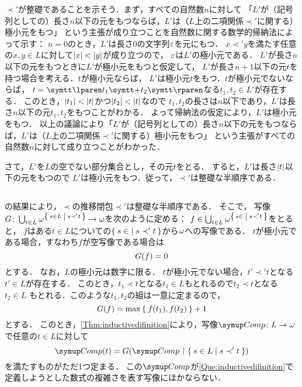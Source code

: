 \(\prec'\)が整礎であることを示そう．まず，すべての自然数\(n\)に対して
「\(L'\)が（記号列としての）長さ\(n\)以下の元をもつならば，\(L'\)は（\(L\)上の二項関係\(\prec'\)に関する）極小元をもつ」
という主張が成り立つことを自然数に関する数学的帰納法によって示す：
\(n=0\)のとき，\(L'\)は長さ0の文字列\(\varepsilon\)を元にもつ．
\(x \prec' y\)を満たす任意の\(x, y \in L\)に対して\(\length{x} < \length{y}\)が成り立つので，
\(\varepsilon\)は\(L'\)の極小元である．
\(L'\)が長さ\(n\)以下の元をもつときに\(L'\)が極小元をもつと仮定して，
\(L'\)が長さ\(n + 1\)以下の元\(t\)を持つ場合を考える．\(t\)が極小元ならば，
\(L'\)は極小元\(t\)をもつ．\(t\)が極小元でないならば，
\(t = \obj{\lparen} t_1 \obj{+} t_2 \obj{\rparen}\)なる\(t_1, t_2 \in L'\)が存在する．
このとき，\(\length{t_1} < \length{t}\)かつ\(\length{t_2} < \length{t}\)なので
\(t_1, t_2\)の長さは\(n\)以下であり，\(L'\)は長さ\(n\)以下の元\(t_1, t_2\)をもつことがわかる．
よって帰納法の仮定により，\(L'\)は極小元をもつ．
以上の議論により「\(L'\)が（記号列としての）長さ\(n\)以下の元をもつならば，\(L'\)は（\(L\)上の二項関係\(\prec'\)に関する）極小元をもつ」
という主張がすべての自然数\(n\)に対して成り立つことがわかった．

さて，\(L'\)を\(L\)の空でない部分集合とし，その元\(t\)をとる．
すると，\(L'\)は長さ\(\length{t}\)以下の元をもつので
\(L'\)は極小元をもつ．従って，\(\prec'\)は整礎な半順序である．

\subsection*{}

の結果により，\(\prec\)の推移閉包\(\prec'\)は整礎な半順序である．
そこで，
写像\(G \colon \bigcup_{t \in L} \omega^{\Set{s \in L | s \prec' t }} \to \omega\)を次のように定める：
\(f \in \bigcup_{t \in L} \omega^{\Set{s \in | s \prec' t}}\)をとると，
\(f\)はある\(t \in L\)についての\(\Set{s \in | s \prec' t}\)から\(\omega\)への写像である．
\(t\)が極小元である場合，すなわち\(f\)が空写像である場合は
\[
	\apply{G}{f} = 0
\]
とする．
なお，\(L\)の極小元は数字に限る．
\(t\)が極小元でない場合，\(t' \prec' t\)となる\(t' \in L\)が存在する．
このとき，\(t_1 \prec t\)となる\(t_1 \in L\)もとれるので\(t_2 \prec t\)となる\(t_2 \in L\)
もとれる．このような\(t_1, t_2\)の組は一意に定まるので，
\[
	\apply{G}{f} = \max \Set{\apply{f}{t_1}, \apply{f}{t_2}} + 1
\]
とする．
\begingroup
{}
このとき，\cref{Thm:inductivedifinition}により，写像\({\Comp} \colon L \to \Natural\)
で任意の\(t \in L\)に対して
\[
	\apply{\Comp}{t} = \apply{G}{ \Comp \restriction \Set{s \in L | s \prec' t}}
\]
を満たすものがただ1つ定まる．
この\(\Comp\)が\cref{Que:inductivedifinition}で定義しようとした数式の複雑さを表す写像にほかならない．
\endgroup


